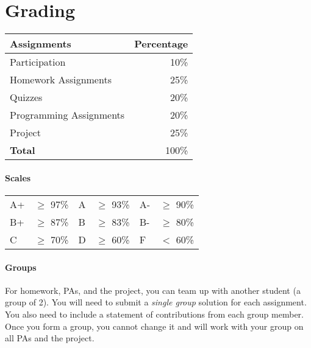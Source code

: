 \documentclass[11pt]{article}
\begin{document}




\section{Grading}\label{sec:grading}

\begin{center}
\begin{tabular}{lr}
\textbf{Assignments} & \textbf{Percentage} \\
\hline
Participation & 10\% \\
Homework Assignments & 25\% \\
Quizzes & 20\% \\
Programming Assignments & 20\% \\
Project & 25\% \\
  \hline
    \textbf{Total} & 100\% \\
\end{tabular}
\end{center}


\paragraph{Scales}

\begin{center}
    \begin{tabular}{ll|ll|ll}
    A+ & $\ge$ 97\% & A & $\ge$  93\% & A- & $\ge$
    90\% \\
    B+ & $\ge$  87\% & B & $\ge$  83\% & B- & $\ge$
    80\% \\
    C & $\ge$  70\% & D & $\ge$  60\% & F & $<$
    60\% \\
    \end{tabular}
    \end{center}

\paragraph{Groups} For homework, PAs, and the project, you can team up with another student (a group of 2). You will need to submit a \emph{single group} solution for each assignment. You also need to include a statement of contributions from each group member. Once you form a group, you cannot change it and will work with your group on all PAs and the project.
\end{document}

